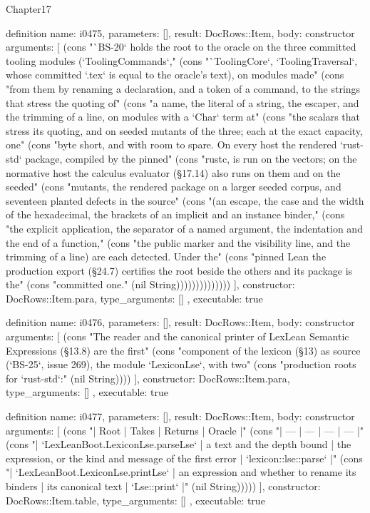 \begin{lexlean}{Chapter17}
\begin{semanticmodule}
definition{
  name: i0475,
  parameters: [],
  result: DocRows::Item,
  body: constructor{
    arguments: [
      (cons "`BS-20` holds the root to the oracle on the three committed tooling modules (`ToolingCommands`," (cons "`ToolingCore`, `ToolingTraversal`, whose committed `.tex` is equal to the oracle's text), on modules made" (cons "from them by renaming a declaration, and a token of a command, to the strings that stress the quoting of" (cons "a name, the literal of a string, the escaper, and the trimming of a line, on modules with a `Char` term at" (cons "the scalars that stress its quoting, and on seeded mutants of the three; each at the exact capacity, one" (cons "byte short, and with room to spare. On every host the rendered `rust-std` package, compiled by the pinned" (cons "rustc, is run on the vectors; on the normative host the calculus evaluator (§17.14) also runs on them and on the seeded" (cons "mutants, the rendered package on a larger seeded corpus, and seventeen planted defects in the source" (cons "(an escape, the case and the width of the hexadecimal, the brackets of an implicit and an instance binder," (cons "the explicit application, the separator of a named argument, the indentation and the end of a function," (cons "the public marker and the visibility line, and the trimming of a line) are each detected. Under the" (cons "pinned Lean the production export (§24.7) certifies the root beside the others and its package is the" (cons "committed one." (nil String))))))))))))))
    ],
    constructor: DocRows::Item.para,
    type_arguments: []
  },
  executable: true
}

definition{
  name: i0476,
  parameters: [],
  result: DocRows::Item,
  body: constructor{
    arguments: [
      (cons "The reader and the canonical printer of LexLean Semantic Expressions (§13.8) are the first" (cons "component of the lexicon (§13) as source (`BS-25`, issue 269), the module `LexiconLse`, with two" (cons "production roots for `rust-std`:" (nil String))))
    ],
    constructor: DocRows::Item.para,
    type_arguments: []
  },
  executable: true
}

definition{
  name: i0477,
  parameters: [],
  result: DocRows::Item,
  body: constructor{
    arguments: [
      (cons "| Root | Takes | Returns | Oracle |" (cons "| --- | --- | --- | --- |" (cons "| `LexLeanBoot.LexiconLse.parseLse` | a text and the depth bound | the expression, or the kind and message of the first error | `lexicon::lse::parse` |" (cons "| `LexLeanBoot.LexiconLse.printLse` | an expression and whether to rename its binders | its canonical text | `Lse::print` |" (nil String)))))
    ],
    constructor: DocRows::Item.table,
    type_arguments: []
  },
  executable: true
}


\end{semanticmodule}
\end{lexlean}
